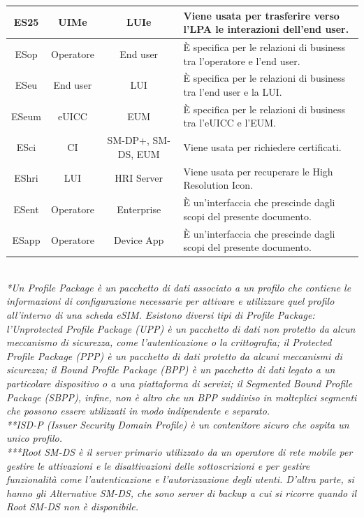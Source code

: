 \documentclass[10pt, twoside, openany]{book}
\begin{document}
\begin{table}[h!]
\begin{center}
\begin{tabularx}{\textwidth}{|c|c|c|X|}
\hline
ES25 & UIMe & LUIe & Viene usata per trasferire verso l'LPA le interazioni dell'end user.\\
\hline
ESop & Operatore & End user & È specifica per le relazioni di business tra l'operatore e l'end user.\\
\hline
ESeu & End user & LUI & È specifica per le relazioni di business tra l'end user e la LUI.\\
\hline
ESeum & eUICC & EUM & È specifica per le relazioni di business tra l'eUICC e l'EUM.\\
\hline
ESci & CI & SM-DP+, SM-DS, EUM & Viene usata per richiedere certificati.\\
\hline
EShri & LUI & HRI Server & Viene usata per recuperare le High Resolution Icon.\\
\hline
ESent & Operatore & Enterprise & È un'interfaccia che prescinde dagli scopi del presente documento.\\
\hline
ESapp & Operatore & Device App & È un'interfaccia che prescinde dagli scopi del presente documento.\\
\hline
\end{tabularx}
\end{center}
\end{table}
\\\textit{*Un Profile Package è un pacchetto di dati associato a un profilo che contiene le informazioni di configurazione necessarie per attivare e utilizzare quel profilo all'interno di una scheda eSIM. Esistono diversi tipi di Profile Package: l'Unprotected Profile Package (UPP) è un pacchetto di dati non protetto da alcun meccanismo di sicurezza, come l'autenticazione o la crittografia; il Protected Profile Package (PPP) è un pacchetto di dati protetto da alcuni meccanismi di sicurezza; il Bound Profile Package (BPP) è un pacchetto di dati legato a un particolare dispositivo o a una piattaforma di servizi; il Segmented Bound Profile Package (SBPP), infine, non è altro che un BPP suddiviso in molteplici segmenti che possono essere utilizzati in modo indipendente e separato.}\\
\textit{**ISD-P (Issuer Security Domain Profile) è un contenitore sicuro che ospita un unico profilo.}\\
\textit{***Root SM-DS è il server primario utilizzato da un operatore di rete mobile per gestire le attivazioni e le disattivazioni delle sottoscrizioni e per gestire funzionalità come l'autenticazione e l'autorizzazione degli utenti. D'altra parte, si hanno gli Alternative SM-DS, che sono server di backup a cui si ricorre quando il Root SM-DS non è disponibile.}
\end{document}
